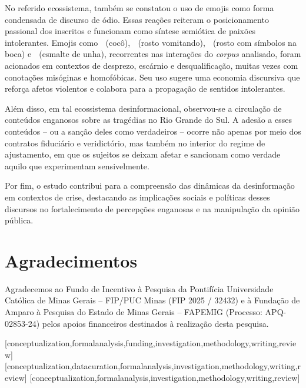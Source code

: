 \documentclass[portuguese]{textolivre}
\begin{document}
No referido ecossistema, também se constatou o uso de emojis como forma condensada de discurso de ódio. Essas reações reiteram o posicionamento passional dos inscritos e funcionam como síntese semiótica de paixões intolerantes. Emojis como {\Symbola 💩} (cocô), {\Symbola 🤮} (rosto vomitando), {\Symbola 🤬} (rosto com símbolos na boca) e {\Symbola 💅} (esmalte de unha), recorrentes nas interações do \textit{corpus} analisado, foram acionados em contextos de desprezo, escárnio e desqualificação, muitas vezes com conotações misóginas e homofóbicas. Seu uso sugere uma economia discursiva que reforça afetos violentos e colabora para a propagação de sentidos intolerantes.

Além disso, em tal ecossistema desinformacional, observou-se a circulação de conteúdos enganosos sobre as tragédias no Rio Grande do Sul. A adesão a esses conteúdos -- ou a sanção deles como verdadeiros -- ocorre não apenas por meio dos contratos fiduciário e veridictório, mas também no interior do regime de ajustamento, em que os sujeitos se deixam afetar e sancionam como verdade aquilo que experimentam sensivelmente. 

Por fim, o estudo contribui para a compreensão das dinâmicas da desinformação em contextos de crise, destacando as implicações sociais e políticas desses discursos no fortalecimento de percepções enganosas e na manipulação da opinião pública.

\section*{Agradecimentos}\label{sec-agradecimentos}
Agradecemos ao Fundo de Incentivo à Pesquisa da Pontifícia Universidade Católica de Minas Gerais -- FIP/PUC Minas (FIP 2025 / 32432) e à Fundação de Amparo à Pesquisa do Estado de Minas Gerais -- FAPEMIG (Processo: APQ-02853-24) pelos apoios financeiros destinados à realização desta pesquisa.


\printbibliography\label{sec-bib}


\begin{contributors}
[conceptualization,formalanalysis,funding,investigation,methodology,writing,review]
[conceptualization,datacuration,formalanalysis,investigation,methodology,writing,review]
[conceptualization,formalanalysis,investigation,methodology,writing,review]
\end{contributors}
\end{document}
